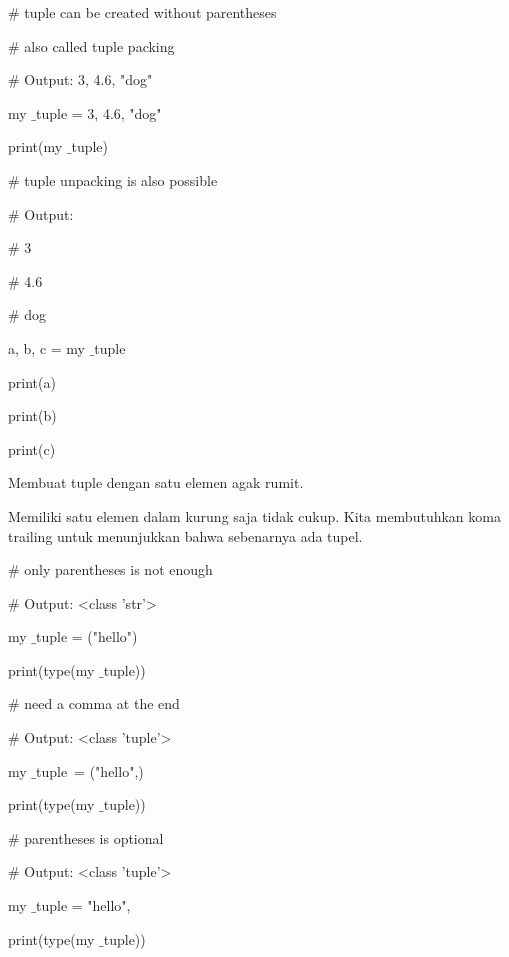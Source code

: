 \vspace{12pt}
 $  \#  $ tuple can be created without parentheses \par
 $  \#  $ also called tuple packing \par
 $  \#  $ Output: 3, 4.6, "dog" \par
\vspace{12pt}
my $  \_  $tuple = 3, 4.6, "dog" \par
print(my $  \_  $tuple) \par
\vspace{12pt}
 $  \#  $ tuple unpacking is also possible \par
 $  \#  $ Output: \par
 $  \#  $ 3 \par
 $  \#  $ 4.6 \par
 $  \#  $ dog \par
a, b, c = my $  \_  $tuple \par
print(a) \par
print(b) \par
print(c) \par
\vspace{12pt}
Membuat tuple dengan satu elemen agak rumit. \par
\vspace{12pt}
Memiliki satu elemen dalam kurung saja tidak cukup. Kita membutuhkan koma trailing untuk menunjukkan bahwa sebenarnya ada tupel. \par
\vspace{12pt}
 $  \#  $ only parentheses is not enough \par
 $  \#  $ Output: <class 'str'> \par
my $  \_  $tuple = ("hello") \par
print(type(my $  \_  $tuple)) \par
\vspace{12pt}
 $  \#  $ need a comma at the end \par
 $  \#  $ Output: <class 'tuple'> \par
my $  \_  $tuple~= ("hello",)   \par
print(type(my $  \_  $tuple)) \par
\vspace{12pt}
 $  \#  $ parentheses is optional \par
 $  \#  $ Output: <class 'tuple'> \par
my $  \_  $tuple = "hello", \par
print(type(my $  \_  $tuple)) \par
\vspace{12pt}
